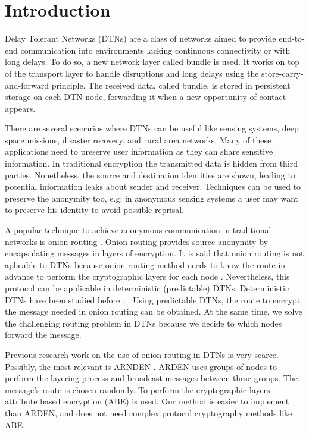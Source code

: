 \section{Introduction}\label{sec:intro}

Delay Tolerant Networks (DTNs) \cite{dtn-definition} are a class of networks aimed to provide end-to-end communication into environments lacking continuous connectivity or with long delays. To do so, a new network layer called bundle is used. It works on top of the transport layer to handle disruptions and long delays using the store-carry-and-forward principle. The received data, called bundle, is stored in persistent storage on each DTN node, forwarding it when a new opportunity of contact appears.

There are several scenarios where DTNs can be useful like sensing systems, deep space missions, disaster recovery, and rural area networks. Many of these applications need to preserve user information as they can share sensitive information. In traditional encryption the transmitted data is hidden from third parties.  Nonetheless, the source and destination identities are shown, leading to potential information leaks about sender and receiver. Techniques can be used to preserve the anonymity too, e.g: in anonymous sensing systems a user may want to preserve his identity to avoid possible reprisal.

A popular technique to achieve anonymous communication in traditional networks is onion routing \cite{onion-routing}. Onion routing provides source anonymity by encapsulating messages in layers of encryption. It is said that onion routing is not aplicable to DTNs because onion routing method needs to know the route in advance to perform the cryptographic layers for each node \cite{dtn-security-analysis}. Nevertheless, this protocol can be applicable in deterministic (predictable) DTNs. Deterministic DTNs have been studied before \cite{probabilistic-dtn}, \cite{deterministic-dtn}. Using predictable DTNs, the route to encrypt the message needed in onion routing can be obtained. At the same time, we solve the challenging routing problem in DTNs \cite{oracle-types} because we decide to which nodes forward the message.

Previous research work on the use of onion routing in DTNs is very scarce. Possibly, the most relevant is ARNDEN \cite{arden}. ARDEN uses groups of nodes to perform the layering process and broadcast messages between these groups. The message's route is chosen randomly. To perform the cryptographic layers attribute based encryption (ABE) is used. Our method is easier to implement than ARDEN, and does not need complex protocol cryptography methods like ABE.


